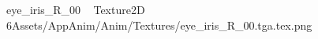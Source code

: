 
   eye_iris_R_00             	   Texture2D
   6   Assets/AppAnim/Anim/Textures/eye_iris_R_00.tga.tex.png